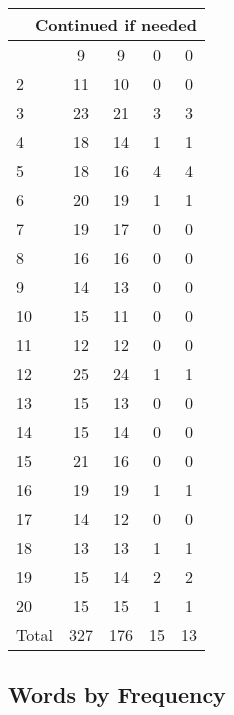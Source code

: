 \begin{center}
\begin{longtable}{l|c|c|c|c}
\hline \multicolumn{5}{|r|}{{Continued if needed}} \\ \hline
\endfoot 
1 & 9 & 9 & 0 & 0\\ \hline
2 & 11 & 10 & 0 & 0\\ \hline
3 & 23 & 21 & 3 & 3\\ \hline
4 & 18 & 14 & 1 & 1\\ \hline
5 & 18 & 16 & 4 & 4\\ \hline
6 & 20 & 19 & 1 & 1\\ \hline
7 & 19 & 17 & 0 & 0\\ \hline
8 & 16 & 16 & 0 & 0\\ \hline
9 & 14 & 13 & 0 & 0\\ \hline
10 & 15 & 11 & 0 & 0\\ \hline
11 & 12 & 12 & 0 & 0\\ \hline
12 & 25 & 24 & 1 & 1\\ \hline
13 & 15 & 13 & 0 & 0\\ \hline
14 & 15 & 14 & 0 & 0\\ \hline
15 & 21 & 16 & 0 & 0\\ \hline
16 & 19 & 19 & 1 & 1\\ \hline
17 & 14 & 12 & 0 & 0\\ \hline
18 & 13 & 13 & 1 & 1\\ \hline
19 & 15 & 14 & 2 & 2\\ \hline
20 & 15 & 15 & 1 & 1\\ \hline
\hline \hline
Total & 327 & 176 & 15 & 13



\end{longtable}
\end{center}

 
\subsection{Words by Frequency}

